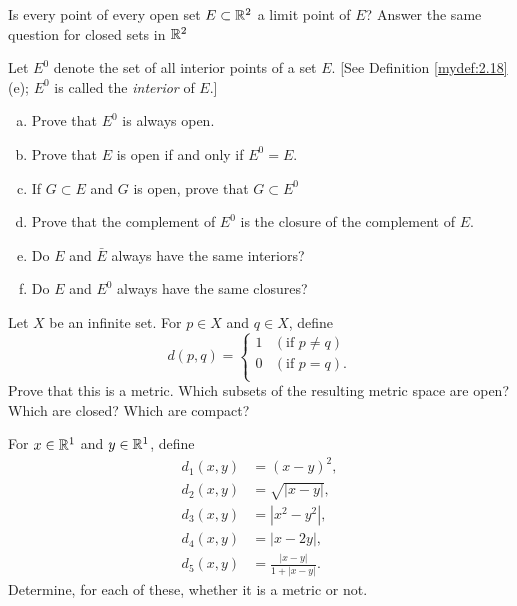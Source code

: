 \begin{myExercise}
    \label{ex:2.8}
    Is every point of every open set $E \subset {\protect\mathbb R}^2$ a limit point of $E$? 
    Answer the same question for closed sets in ${\protect\mathbb R}^2$
\end{myExercise}

\begin{myExercise}
    \label{ex:2.9}
    Let $E^0$ denote the set of all interior points of a set $E$. 
    [See Definition \ref{mydef:2.18}(e);
    $E^0$ is called the \emph{interior} of $E$.]
    \begin{enumerate}[(a)]
        \item Prove that $E^0$ is always open.
        \item Prove that $E$ is open if and only if $E^0 = E$.
        \item If $G \subset E$ and $G$ is open, prove that $G \subset E^0$
        \item Prove that the complement of $E^0$ is the closure of the complement of $E$.
        \item Do $E$ and $\bar{E}$ always have the same interiors?
        \item Do $E$ and $E^0$ always have the same closures?
    \end{enumerate}
\end{myExercise}

\begin{myExercise}
    \label{ex:2.10}
    Let $X$ be an infinite set. 
    For $p \in X$ and $q \in X$, define
    \begin{equation*}
        d(p,q) = \left\{ 
            \begin{array}{ll}
                1 & (\text{if } p \neq q) \\
                0 & (\text{if } p =    q). \\
            \end{array}
         \right.
    \end{equation*}
    Prove that this is a metric. 
    Which subsets of the resulting metric space are open?
    Which are closed? 
    Which are compact?
\end{myExercise}

\begin{myExercise}
    \label{ex:2.11}
    For $x \in {\protect\mathbb R}^1$ and $y \in {\protect\mathbb R}^1$, define
    \begin{align*}
        d_1(x,y) &= (x-y)^2, \\
        d_2(x,y) &= \sqrt{|x-y|}, \\
        d_3(x,y) &= |x^2-y^2|, \\
        d_4(x,y) &= |x-2y|, \\
        d_5(x,y) &= \frac{|x-y|}{1+|x-y|}.
    \end{align*}
    Determine, for each of these, 
    whether it is a metric or not.
\end{myExercise}

